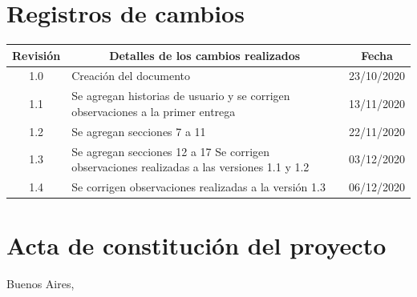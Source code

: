 \documentclass[11pt]{charter}
\begin{document}
\maketitle
\thispagestyle{empty}
\pagebreak


\thispagestyle{empty}
{\setlength{\parskip}{0pt}
\tableofcontents{}
}
\pagebreak


\section{Registros de cambios}
\label{sec:registro}


\begin{table}[ht]
\label{tab:registro}
\centering
\begin{tabularx}{\linewidth}{@{}|c|X|c|@{}}
\hline
\rowcolor[HTML]{C0C0C0} 
Revisión & \multicolumn{1}{c|}{\cellcolor[HTML]{C0C0C0}Detalles de los cambios realizados} & Fecha      \\ \hline
1.0      & Creación del documento                                          & 23/10/2020 \\ \hline
1.1      & Se agregan historias de usuario y se corrigen observaciones a la primer entrega                                 & 13/11/2020 \\ \hline
1.2      & Se agregan secciones 7 a 11 & 22/11/2020\\ \hline
1.3      & Se agregan secciones 12 a 17  \newline
 Se corrigen observaciones realizadas a las versiones 1.1 y 1.2 & 03/12/2020 \\ \hline
1.4      & Se corrigen observaciones realizadas a la versión 1.3  & 06/12/2020\\ \hline 
\end{tabularx}
\end{table}

\pagebreak



\section{Acta de constitución del proyecto}
\label{sec:acta}

\begin{flushright}
Buenos Aires, \fechaInicioName
\end{flushright}
\end{document}
